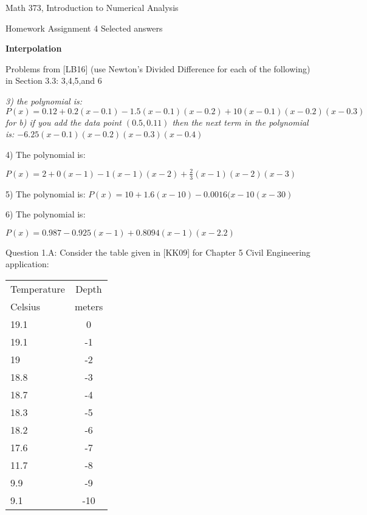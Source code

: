 \documentclass{article}
\renewcommand{\cite}[1]{[#1]}
\def\ds{\displaystyle}
\begin{document}

\large

{\Large Math 373, Introduction to Numerical Analysis}


{\Large Homework Assignment 4 {\color{teal}Selected answers}} 
\par \medskip \par



{\bf Interpolation} \par \medskip \noindent
Problems from \cite{LB16} (use Newton's Divided Difference for each of the following) in Section 3.3: 3,4,5,and 6  
{\it \color{teal} 3) the polynomial is: $P(x) = 0.12 + 0.2(x-0.1) - 1.5(x-0.1)(x-0.2) + 10(x-0.1)(x-0.2)(x-0.3)$ for b) if you add the data point $(0.5,0.11)$ then the next term in the polynomial is: $-6.25(x-0.1)(x-0.2)(x-0.3)(x-0.4)$ \par 
4) The polynomial is: \par $\ds P(x) = 2 + 0(x-1)-1(x-1)(x-2)+\frac 23(x-1)(x-2)(x-3)$ \par
5) The polynomial is: $\ds P(x) = 10 + 1.6(x-10)-0.0016(x-10(x-30)$ \par
6) The polynomial is: \par
$P(x)=0.987-0.925(x-1) + 0.8094 (x-1)(x-2.2)$}
\par \medskip \noindent
%
Question 1.A:  Consider the table given in \cite{KK09} for Chapter 5 Civil Engineering application: \par
\begin{tabular}{|l|c|}
\hline
Temperature & Depth\\

Celsius & meters\\
\hline
19.1 & 0 \\
\hline
19.1 & -1 \\
\hline
19 & -2 \\
\hline
18.8 & -3 \\
\hline
18.7 & -4 \\
\hline
18.3 & -5 \\
\hline
18.2 & -6 \\
\hline
17.6 & -7 \\
\hline
11.7 & -8 \\
\hline
9.9 & -9 \\
\hline
9.1 & -10 \\
\hline
\end{tabular}
\end{document}
